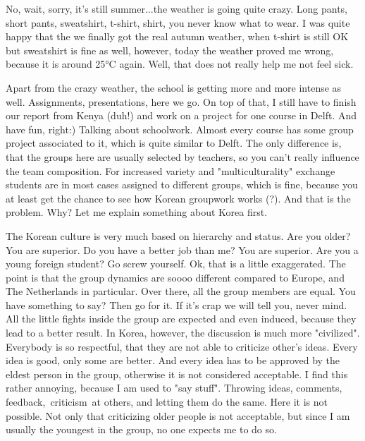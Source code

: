\begin{post}
	\begin{content}
No, wait, sorry, it's still summer...the weather is going quite crazy. Long pants, short pants, sweatshirt, t-shirt, shirt, you never know what to wear. I was quite happy that the we finally got the real autumn weather, when t-shirt is still OK but sweatshirt is fine as well, however, today the weather proved me wrong, because it is around 25°C again. Well, that does not really help me not feel sick.

Apart from the crazy weather, the school is getting more and more intense as well. Assignments, presentations, here we go. On top of that, I still have to finish our report from Kenya (duh!) and work on a project for one course in Delft. And have fun, right:) Talking about schoolwork. Almost every course has some group project associated to it, which is quite similar to Delft. The only difference is, that the groups here are usually selected by teachers, so you can't really influence the team composition. For increased variety and "multiculturality" exchange students are in most cases assigned to different groups, which is fine, because you at least get the chance to see how Korean groupwork works (?). And that is the problem. Why? Let me explain something about Korea first.

The Korean culture is very much based on hierarchy and status. Are you older? You are superior. Do you have a better job than me? You are superior. Are you a young foreign student? Go screw yourself. Ok, that is a little exaggerated. The point is that the group dynamics are soooo different compared to Europe, and The Netherlands in particular. Over there, all the group members are equal. You have something to say? Then go for it. If it's crap we will tell you, never mind. All the little fights inside the group are expected and even induced, because they lead to a better result. In Korea, however, the discussion is much more "civilized". Everybody is so respectful, that they are not able to criticize other's ideas. Every idea is good, only some are better. And every idea has to be approved by the eldest person in the group, otherwise it is not considered acceptable. I find this rather annoying, because I am used to "say stuff". Throwing ideas, comments, feedback, criticism at others, and letting them do the same. Here it is not possible. Not only that criticizing older people is not acceptable, but since I am usually the youngest in the group, no one expects me to do so.


\end{content}
\end{post}
